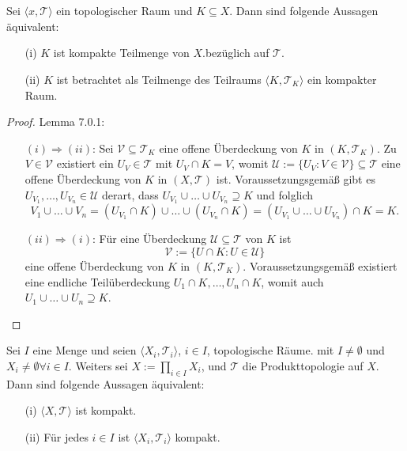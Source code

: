 \chapter{}
\mlenma{}
{

    Sei $\langle x, \mathcal{T} \rangle$ ein topologischer Raum und $K \subseteq X$.
    Dann sind folgende Aussagen äquivalent:
    \begin{enumerate}
        \item[(i)] $K$ ist kompakte Teilmenge von $X$.bezüglich auf $\mathcal{T}$.
        \item[(ii)]  $K$ ist betrachtet als Teilmenge des Teilraums
        $\langle K, \mathcal{T}_K \rangle$ ein kompakter Raum.
    \end{enumerate}
}


\begin{proof}{Lemma 7.0.1:}\\
    \begin{enumerate}
    \item[$(i) \Rightarrow (ii)$:] 
    Sei $\mathcal{V} \subseteq \mathcal{T}_K$ eine offene Überdeckung von $K$ in $(K, \mathcal{T}_K)$. 
    Zu $V \in \mathcal{V}$ existiert ein $U_V \in \mathcal{T}$ mit $U_V \cap K = V$, womit 
    $\mathcal{U} := \{U_V : V \in \mathcal{V}\} \subseteq \mathcal{T}$ eine offene Überdeckung von 
    $K$ in $(X, \mathcal{T})$ ist. 
    Voraussetzungsgemäß gibt es $U_{V_1}, \ldots, U_{V_n} \in \mathcal{U}$ derart, dass 
    $U_{V_1} \cup \ldots \cup U_{V_n} \supseteq K$ und folglich
    $$
    V_1 \cup \ldots \cup V_n 
    = (U_{V_1} \cap K) \cup \ldots \cup (U_{V_n} \cap K) 
    = (U_{V_1} \cup \ldots \cup U_{V_n}) \cap K 
    = K.
    $$

    \item[$(ii) \Rightarrow (i)$:]
    Für eine Überdeckung $\mathcal{U} \subseteq \mathcal{T}$ von $K$ ist
    $$
    \mathcal{V} := \{U \cap K : U \in \mathcal{U}\}
    $$
    eine offene Überdeckung von $K$ in $(K, \mathcal{T}_K)$. 
    Voraussetzungsgemäß existiert eine endliche Teilüberdeckung 
    $U_1 \cap K, \ldots, U_n \cap K$, womit auch 
    $U_1 \cup \ldots \cup U_n \supseteq K$.
    \end{enumerate}
    
\end{proof} 

{
    Sei $I$ eine Menge und seien $\langle X_i, \mathcal{T}_i \rangle$, $i \in I$, topologische Räume. 
    mit $I \neq \emptyset$ und $X_i \neq \emptyset \forall i \in I$. 
    Weiters sei  $X := \prod_{i \in I} X_i$, und  $\mathcal{T}$ die Produkttopologie auf $X$. 
    Dann sind folgende Aussagen äquivalent:
    \begin{enumerate}
    \item[(i)]$\langle X, \mathcal{T} \rangle$ ist kompakt.
    \item[(ii)] Für jedes $i \in I$ ist $\langle X_i, \mathcal{T}_i \rangle$ kompakt.
    \end{enumerate}
}

